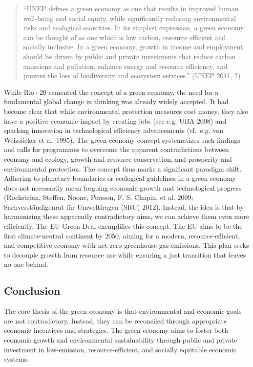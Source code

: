 \documentclass[
  a4paper,
  DIV=11,
  numbers=noendperiod,
  oneside,
  openany]{scrreprt}
\begin{document}
\begin{quote}
``UNEP defines a green economy as one that results in improved human
well-being and social equity, while significantly reducing environmental
risks and ecological scarcities. In its simplest expression, a green
economy can be thought of as one which is low carbon, resource efficient
and socially inclusive. In a green economy, growth in income and
employment should be driven by public and private investments that
reduce carbon emissions and pollution, enhance energy and resource
efficiency, and prevent the loss of biodiversity and ecosystem
services.'' (UNEP 2011, 2)
\end{quote}

While Rio+20 cemented the concept of a green economy, the need for a
fundamental global change in thinking was already widely accepted. It
had become clear that while environmental protection measures cost
money, they also have a positive economic impact by creating jobs (see
e.g. UBA 2008) and sparking innovation in technological efficiency
advancements (cf.~e.g. {von Weizsäcker et al.} 1995). The green economy
concept systematizes such findings and calls for programmes to overcome
the apparent contradictions between economy and ecology, growth and
resource conservation, and prosperity and environmental protection. The
concept thus marks a significant paradigm shift. Adhering to planetary
boundaries or ecological guidelines in a green economy does not
necessarily mean forgoing economic growth and technological progress
(Rockström, Steffen, Noone, Persson, F. S. Chapin, et al. 2009;
Sachverständigenrat für Umweltfragen (SRU) 2012). Instead, the idea is
that by harmonizing these apparently contradictory aims, we can achieve
them even more efficiently. The EU Green Deal exemplifies this concept.
The EU aims to be the first climate-neutral continent by 2050, aiming
for a modern, resource-efficient, and competitive economy with net-zero
greenhouse gas emissions. This plan seeks to decouple growth from
resource use while ensuring a just transition that leaves no one behind.

\subsection{Conclusion}\label{conclusion-3}

The core thesis of the green economy is that environmental and economic
goals are not contradictory. Instead, they can be reconciled through
appropriate economic incentives and strategies. The green economy aims
to foster both economic growth and environmental sustainability through
public and private investment in low-emission, resource-efficient, and
socially equitable economic systems.
\end{document}
